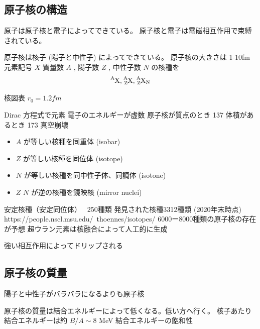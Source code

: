 \documentclass[uplatex,dvipdfmx,a4paper,11pt]{jlreq}
\numberwithin{equation}{section}
\theoremstyle{definition}
\begin{document}
\subsection{原子核の構造}
原子は原子核と電子によってできている。
原子核と電子は電磁相互作用で束縛されている。

原子核は核子 (陽子と中性子) によってできている。
原子核の大きさは 1-10fm
元素記号 $X$
質量数 $A$ , 陽子数 $Z$ , 中性子数 $N$ の核種を
\begin{align}
  \ce{^AX}, \ce{^A_ZX}, \ce{^A_ZX_N}
\end{align}

核図表
$r_0 = 1.2 \si{fm}$

Dirac 方程式で元素
電子のエネルギーが虚数
原子核が質点のとき 137
体積があるとき 173
真空崩壊

\begin{itemize}
  \item $A$ が等しい核種を同重体 (isobar)
  \item $Z$ が等しい核種を同位体 (isotope)
  \item $N$ が等しい核種を同中性子体、同調体 (isotone)
  \item $Z$ $N$ が逆の核種を鏡映核 (mirror nuclei)
\end{itemize}

安定核種（安定同位体） ~250種類
発見された核種3312種類 (2020年末時点)
https://people.nscl.msu.edu/~thoennes/isotopes/
6000ー8000種類の原子核の存在が予想
超ウラン元素は核融合によって人工的に生成

強い相互作用によってドリップされる


\subsection{原子核の質量}
陽子と中性子がバラバラになるよりも原子核

原子核の質量は結合エネルギーによって低くなる。低い方へ行く。
核子あたり結合エネルギーは約 $B/A\sim 8$ \si{MeV}
結合エネルギーの飽和性
\end{document}
